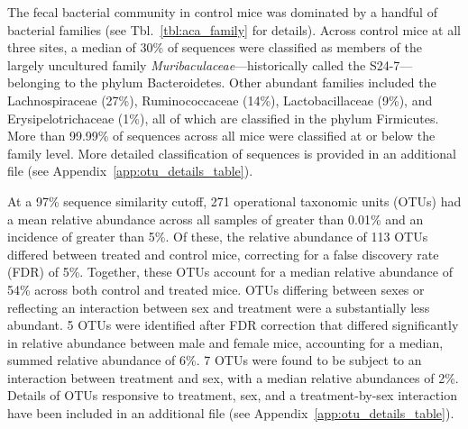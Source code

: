 \documentclass{doc/template/bmcart-nofigbox}
\newcommand{\frnlang}[1]{\textit{#1}}
\newcommand{\taxon}[1]{\frnlang{#1}}
\begin{document}
The fecal bacterial community in control mice was dominated by a handful
of bacterial families (see Tbl.~\ref{tbl:aca_family} for details).
Across control mice at all three sites, a median of 30\% of sequences were
classified as members of the largely uncultured family
\taxon{Muribaculaceae}---historically called the S24-7---belonging to the
phylum Bacteroidetes.
Other abundant families included the Lachnospiraceae (27\%),
Ruminococcaceae (14\%), Lactobacillaceae (9\%), and Erysipelotrichaceae (1\%),
all of which are classified in the phylum Firmicutes.
More than 99.99\% of sequences across all mice were classified at or below the
family level.
More detailed classification of sequences is provided in an additional file
(see Appendix~\ref{app:otu_details_table}).

At a 97\% sequence similarity cutoff, 271 operational taxonomic units (OTUs)
had a mean relative abundance across all samples of greater than 0.01\% and an
incidence of greater than 5\%.
Of these, the relative abundance of 113 OTUs differed between treated
and control mice, correcting for a false discovery rate (FDR) of 5\%.
Together, these OTUs account for a median relative abundance of 54\% across
both control and treated mice.
OTUs differing between sexes or reflecting an interaction between sex and
treatment were a substantially less abundant.
5 OTUs were identified after FDR correction that differed
significantly in relative abundance between male and female mice,
accounting for a median, summed relative abundance of 6\%.
7 OTUs were found to be subject to an interaction between treatment and
sex, with a median relative abundances of 2\%.
Details of OTUs responsive to treatment, sex,
and a treatment-by-sex interaction have been included in an additional file
(see Appendix~\ref{app:otu_details_table}).
\end{document}
